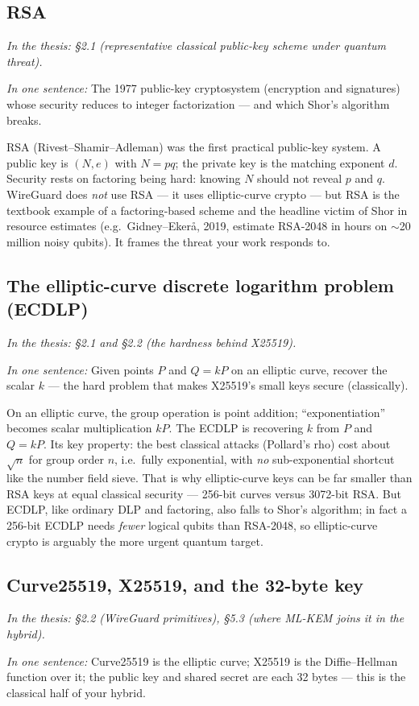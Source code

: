 \documentclass[11pt]{article}
\newcommand{\seethesis}[1]{%
  {\small\color{softgray}\textit{In the thesis: #1}}\par\vspace{3pt}}
\newcommand{\nutshell}[1]{\noindent\textit{In one sentence:} #1\par\vspace{4pt}}
\begin{document}
\subsection{RSA}
\seethesis{\S2.1 (representative classical public-key scheme under quantum threat).}
\nutshell{The 1977 public-key cryptosystem (encryption and signatures) whose
security reduces to integer factorization --- and which Shor's algorithm breaks.}

RSA (Rivest--Shamir--Adleman) was the first practical public-key system. A public
key is $(N, e)$ with $N = pq$; the private key is the matching exponent $d$.
Security rests on factoring being hard: knowing $N$ should not reveal $p$ and
$q$. WireGuard does \emph{not} use RSA --- it uses elliptic-curve crypto --- but
RSA is the textbook example of a factoring-based scheme and the headline victim
of Shor in resource estimates (e.g.\ Gidney--Eker\aa, 2019, estimate RSA-2048 in
hours on $\sim$20 million noisy qubits). It frames the threat your work responds
to.

\subsection{The elliptic-curve discrete logarithm problem (ECDLP)}
\seethesis{\S2.1 and \S2.2 (the hardness behind X25519).}
\nutshell{Given points $P$ and $Q = kP$ on an elliptic curve, recover the scalar
$k$ --- the hard problem that makes X25519's small keys secure (classically).}

On an elliptic curve, the group operation is point addition; ``exponentiation''
becomes scalar multiplication $kP$. The ECDLP is recovering $k$ from $P$ and
$Q=kP$. Its key property: the best classical attacks (Pollard's rho) cost about
$\sqrt{n}$ for group order $n$, i.e.\ fully exponential, with \emph{no}
sub-exponential shortcut like the number field sieve. That is why elliptic-curve
keys can be far smaller than RSA keys at equal classical security --- 256-bit
curves versus 3072-bit RSA. But ECDLP, like ordinary DLP and factoring, also
falls to Shor's algorithm; in fact a 256-bit ECDLP needs \emph{fewer} logical
qubits than RSA-2048, so elliptic-curve crypto is arguably the more urgent quantum
target.

\subsection{Curve25519, X25519, and the 32-byte key}
\seethesis{\S2.2 (WireGuard primitives), \S5.3 (where ML-KEM joins it in the hybrid).}
\nutshell{Curve25519 is the elliptic curve; X25519 is the Diffie--Hellman
function over it; the public key and shared secret are each 32 bytes --- this is
the classical half of your hybrid.}
\end{document}
